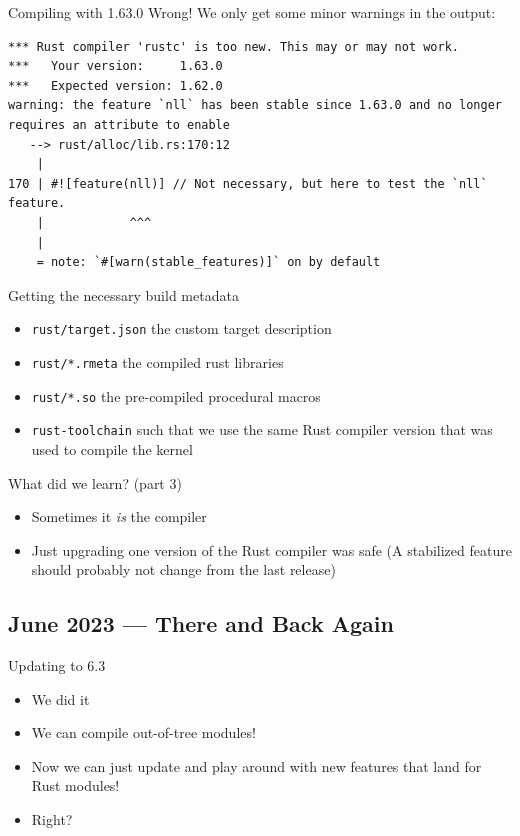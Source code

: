 \begin{frame}[c,fragile]{Compiling with 1.63.0}
  Wrong! We only get some minor warnings in the output:
\begin{verbatim}
*** Rust compiler 'rustc' is too new. This may or may not work.
***   Your version:     1.63.0
***   Expected version: 1.62.0
warning: the feature `nll` has been stable since 1.63.0 and no longer requires an attribute to enable
   --> rust/alloc/lib.rs:170:12
    |
170 | #![feature(nll)] // Not necessary, but here to test the `nll` feature.
    |            ^^^
    |
    = note: `#[warn(stable_features)]` on by default
\end{verbatim}
\end{frame}

\begin{frame}[c]{Getting the necessary build metadata}
  \begin{itemize}
    \item \texttt{rust/target.json} the custom target description
    \item \texttt{rust/*.rmeta} the compiled rust libraries
    \item \texttt{rust/*.so} the pre-compiled procedural macros
    \item \texttt{rust-toolchain} such that we use the same Rust compiler
      version that was used to compile the kernel
  \end{itemize}
\end{frame}

\begin{frame}[c]{What did we learn? (part 3)}
  \begin{itemize}
    \item Sometimes it \emph{is} the compiler
    \item Just upgrading one version of the Rust compiler was safe (A
      stabilized feature should probably not change from the last release)
  \end{itemize}
\end{frame}

\subsection{June 2023 — There and Back Again}

\begin{frame}[c]{Updating to 6.3}
  \begin{itemize}
    \item We did it
    \item We can compile out-of-tree modules!
    \item Now we can just update and play around with new features that land for Rust modules!
    \pause\item Right?
  \end{itemize}
\end{frame}

